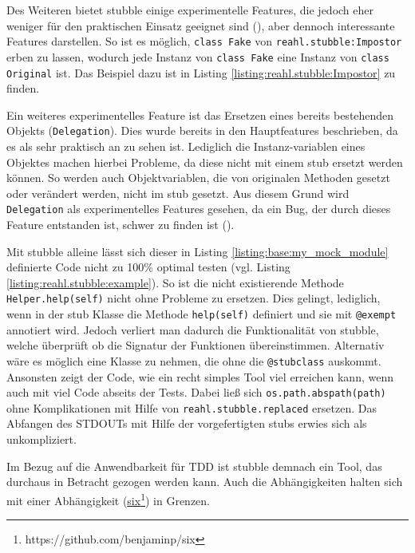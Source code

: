 Des Weiteren bietet stubble einige experimentelle Features, die jedoch eher
weniger für den praktischen Einsatz geeignet sind (\cite{reahl.stubble:4.0}),
aber dennoch interessante Features darstellen. So ist es möglich,
\lstinline{class Fake} von \lstinline{reahl.stubble:Impostor} erben zu lassen,
wodurch jede Instanz von \lstinline{class Fake} eine Instanz von
\lstinline{class Original} ist. Das Beispiel dazu ist in Listing
\ref{listing:reahl.stubble:Impostor} zu finden.

Ein weiteres experimentelles Feature ist das Ersetzen eines bereits bestehenden
Objekts (\lstinline{Delegation}). Dies wurde bereits in den Hauptfeatures
beschrieben, da es als sehr praktisch an zu sehen ist. Lediglich die
Instanz-variablen eines Objektes machen hierbei Probleme, da diese nicht mit
einem \Gls{stub} ersetzt werden können. So werden auch Objektvariablen, die von
originalen Methoden gesetzt oder verändert werden, nicht im \Gls{stub} gesetzt.
Aus diesem Grund wird \lstinline{Delegation} als experimentelles Features
gesehen, da ein Bug, der durch dieses Feature entstanden ist, schwer zu finden
ist (\cite{reahl.stubble:4.0}).
\newline

Mit stubble alleine lässt sich dieser in Listing 
\ref{listing:base:my_mock_module} definierte Code nicht zu 100\% optimal testen
(vgl. Listing \ref{listing:reahl.stubble:example}). So ist die nicht
existierende Methode \lstinline{Helper.help(self)} nicht ohne Probleme zu
ersetzen. Dies gelingt, lediglich, wenn in der \Gls{stub} Klasse die Methode
\lstinline{help(self)} definiert und sie mit \lstinline{@exempt} annotiert
wird. Jedoch verliert man dadurch die Funktionalität von stubble, welche
überprüft ob die Signatur der Funktionen übereinstimmen. Alternativ wäre es
möglich eine Klasse zu nehmen, die ohne die \lstinline{@stubclass} auskommt.
Ansonsten zeigt der Code, wie ein recht simples Tool viel erreichen kann, wenn
auch mit viel Code abseits der Tests. Dabei ließ sich
\lstinline{os.path.abspath(path)} ohne Komplikationen mit Hilfe von
\lstinline{reahl.stubble.replaced} ersetzen. Das Abfangen des STDOUTs mit Hilfe
der vorgefertigten \Glspl{stub} erwies sich als unkompliziert.
\newline

Im Bezug auf die Anwendbarkeit für TDD ist stubble demnach ein Tool, das
durchaus in Betracht gezogen werden kann. Auch die Abhängigkeiten halten sich
mit einer Abhängigkeit
(\href{https://github.com/benjaminp/six}{six}\footnote{https://github.com/benjaminp/six})
in Grenzen.

